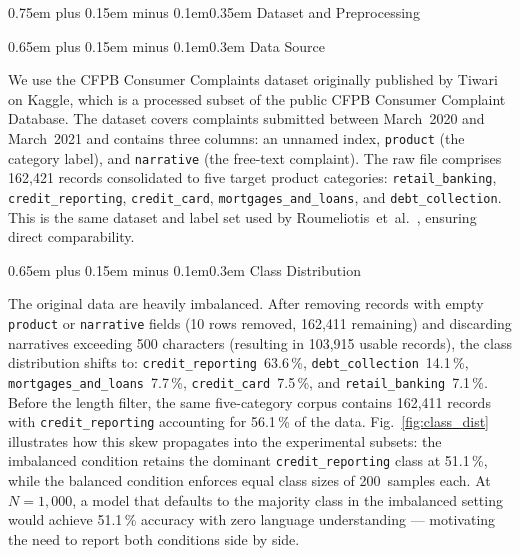 \documentclass[10pt,a4paper,twocolumn]{article}
\makeatletter
\renewcommand\section{\@startsection{section}{1}{0pt}%
  {0.75em plus 0.15em minus 0.1em}{0.35em}%
  {\normalfont\normalsize\itshape}}
\renewcommand\subsection{\@startsection{subsection}{2}{0pt}%
  {0.65em plus 0.15em minus 0.1em}{0.3em}%
  {\normalfont\normalsize\itshape}}
\makeatother
\begin{document}
\section{Dataset and Preprocessing}
\label{sec:data}

\subsection{Data Source}

We use the CFPB Consumer Complaints dataset originally published by
Tiwari \cite{tiwari2021cfpb} on Kaggle, which is a processed subset
of the public CFPB Consumer Complaint Database. The dataset covers
complaints submitted between March~2020 and March~2021 and contains
three columns: an unnamed index, \texttt{product} (the category label),
and \texttt{narrative} (the free-text complaint). The raw file
comprises 162,421 records consolidated to five target product categories:
\texttt{retail\_banking}, \texttt{credit\_reporting},
\texttt{credit\_card}, \texttt{mortgages\_and\_loans}, and
\texttt{debt\_collection}. This is the same dataset and label set used
by Roumeliotis~et~al.\ \cite{roumeliotis2025think}, ensuring
direct comparability.

\subsection{Class Distribution}

The original data are heavily imbalanced. After removing records with
empty \texttt{product} or \texttt{narrative} fields (10 rows removed,
162,411 remaining) and discarding narratives exceeding 500 characters
(resulting in 103,915 usable records), the class distribution shifts
to: \texttt{credit\_reporting}~63.6\,\%,
\texttt{debt\_collection}~14.1\,\%,
\texttt{mortgages\_and\_loans}~7.7\,\%,
\texttt{credit\_card}~7.5\,\%, and
\texttt{retail\_banking}~7.1\,\%. Before the length filter, the same
five-category corpus contains 162,411 records with
\texttt{credit\_reporting} accounting for 56.1\,\% of the data.
Fig.~\ref{fig:class_dist} illustrates how this skew propagates into
the experimental subsets: the imbalanced condition retains the
dominant \texttt{credit\_reporting} class at 51.1\,\%, while the
balanced condition enforces equal class sizes of 200~samples each.
At $N{=}1{,}000$, a model that defaults to the majority class in the
imbalanced setting would achieve 51.1\,\% accuracy with zero
language understanding --- motivating the need to report both conditions
side by side.
\end{document}

